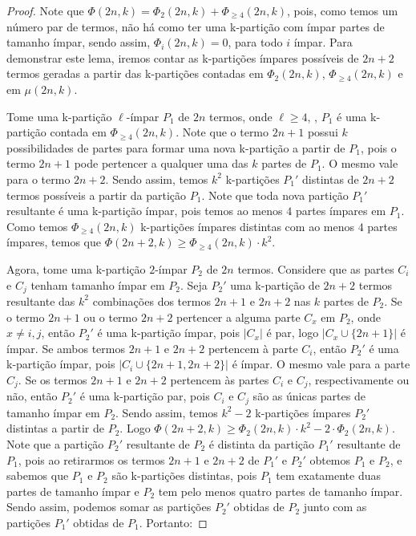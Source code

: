\documentclass[12pt]{article}
\begin{document}
  \begin{proof}
  	
  	Note que $\Phi(2n, k) = \Phi_2(2n, k) + \Phi_{\geq 4}(2n, k)$, pois, como temos um número par de termos, não há como ter uma k-partição com ímpar partes de tamanho ímpar, sendo assim, $\Phi_i(2n, k) = 0$, para todo $i$ ímpar. Para demonstrar este lema, iremos contar as k-partições ímpares possíveis de $2n+2$ termos geradas a partir das k-partições contadas em $\Phi_2(2n, k) $, $\Phi_{\geq 4}(2n, k)$ e em $\mu(2n, k)$. \newl
  	
  	Tome uma k-partição $\ell$-ímpar $P_1$ de $2n$ termos, onde $\ell \geq 4$, \ie, $P_1$ é uma k-partição contada em $ \Phi_{\geq 4}(2n, k)$. Note que o termo $2n+1$ possui $k$ possibilidades de partes para formar uma nova k-partição a partir de $P_1$, pois o termo $2n+1$ pode pertencer a qualquer uma das $k$ partes de $P_1$. O mesmo vale para o termo $2n+2$. Sendo assim, temos $k^2$ k-partições $P_1'$ distintas de $2n+2$ termos possíveis a partir da partição $P_1$. Note que toda nova partição $P_1'$ resultante é uma k-partição ímpar, pois temos ao menos $4$ partes ímpares em $P_1$. Como temos $\Phi_{\geq 4}(2n, k)$ k-partições ímpares distintas com ao menos $4$ partes ímpares, temos que $\Phi(2n+2, k) \geq \Phi_{\geq 4}(2n, k) \cdot k^2$. \newl
  	
  	Agora, tome uma k-partição $2$-ímpar $P_2$ de $2n$ termos. Considere que as partes $C_i$ e $C_j$ tenham tamanho ímpar em $P_2$. Seja $P_2'$ uma k-partição de $2n+2$ termos resultante das $k^2$ combinações dos termos $2n+1$ e $2n+2$ nas $k$ partes de $P_2$. Se o termo $2n+1$ ou o termo $2n+2$ pertencer a alguma parte $C_x$ em $P_2$, onde $x \neq i, j$, então $P_2'$ é uma k-partição ímpar, pois $|C_x|$ é par, logo $|C_x \cup \{2n+1\}|$ é ímpar. Se ambos termos $2n+1$ e $2n+2$ pertencem à parte $C_i$, então $P_2'$ é uma k-partição ímpar, pois $|C_i \cup \{2n+1, 2n+2\}|$ é ímpar. O mesmo vale para a parte $C_j$. Se os termos $2n+1$ e $2n+2$ pertencem às partes $C_i$ e $C_j$, respectivamente ou não, então $P_2'$ é uma k-partição par, pois $C_i$ e $C_j$ são as únicas partes de tamanho ímpar em $P_2$. Sendo assim, temos $k^2 - 2$ k-partições ímpares $P_2'$ distintas a partir de $P_2$. Logo $\Phi(2n+2, k) \geq \Phi_{2}(2n, k) \cdot k^2 - 2 \cdot \Phi_{2}(2n, k)$. Note que a partição $P_2'$ resultante de $P_2$ é distinta da partição $P_1'$ resultante de $P_1$, pois ao retirarmos os termos $2n+1$ e $2n+2$ de $P_1'$ e $P_2'$ obtemos $P_1$ e $P_2$, e sabemos que $P_1$ e $P_2$ são k-partições distintas, pois $P_1$ tem exatamente duas partes de tamanho ímpar e $P_2$ tem pelo menos quatro partes de tamanho ímpar. Sendo assim, podemos somar as partições $P_2'$ obtidas de $P_2$ junto com as partições $P_1'$ obtidas de $P_1$. Portanto:
  	

\end{proof}
\end{document}
